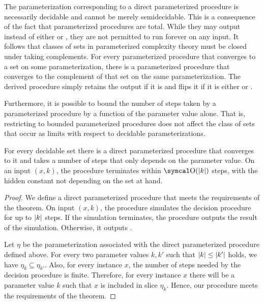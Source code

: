 The parameterization corresponding to a direct parameterized procedure is necessarily decidable and cannot be merely semidecidable.
This is a consequence of the fact that parameterized procedures are total.
While they may output  instead of either  or , they are not permitted to run forever on any input.
It follows that classes of sets in parameterized complexity theory must be closed under taking complements.
For every parameterized procedure that converges to a set on some parameterization, there is a parameterized procedure that converges to the complement of that set on the same parameterization.
The derived procedure simply retains the output if it is  and flips it if it is either  or .

Furthermore, it is possible to bound the number of steps taken by a parameterized procedure by a function of the parameter value alone.
That is, restricting to bounded parameterized procedures does not affect the class of sets that occur as limits with respect to decidable parameterizations.

\begin{theorem}
\label{thm:slow_decidable}%
  For every decidable set there is a direct parameterized procedure that converges to it and takes a number of steps that only depends on the parameter value.
  On an input $(x, k)$, the procedure terminates within $\bigO(\length{k})$ steps, with the hidden constant not depending on the set at hand.
\end{theorem}
\begin{proof}
  We define a direct parameterized procedure that meets the requirements of the theorem.
  On input $(x, k)$, the procedure simulates the decision procedure for up to ${\lvert k\rvert}$ steps.
  If the simulation terminates, the procedure outputs the result of the simulation.
  Otherwise, it outputs .

  Let $\eta$ be the parameterization associated with the direct parameterized procedure defined above.
  For every two parameter values $k, k'$ such that ${\lvert k\rvert} \le {\lvert k'\rvert}$ holds, we have $\eta_k \subseteq \eta_{k'}$.
  Also, for every instance $x$, the number of steps needed by the decision procedure is finite.
  Therefore, for every instance $x$ there will be a parameter value $k$ such that $x$ is included in slice $\eta_k$.
  Hence, our procedure meets the requirements of the theorem.
\end{proof}

